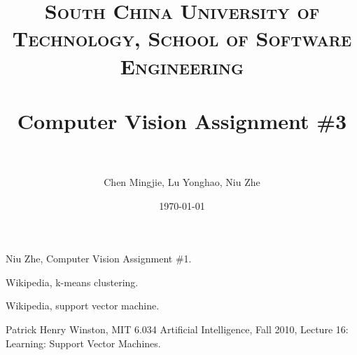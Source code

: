 \documentclass[paper=a4, fontsize=11pt]{scrartcl} %
\title{	
\normalfont \normalsize 
\textsc{South China University of Technology, School of Software Engineering} \\ [25pt] %
\horrule{0.5pt} \\[0.4cm] %
\huge Computer Vision Assignment \#3 \\ %
\horrule{2pt} \\[0.5cm] %
}
\author{Chen Mingjie, Lu Yonghao, Niu Zhe} %
\date{\normalsize\today} %
\numberwithin{equation}{section} %
\numberwithin{figure}{section} %
\numberwithin{table}{section} %
\begin{document}
\maketitle %





















\renewcommand\refname{Reference}

\begin{thebibliography}{99}
Niu Zhe, Computer Vision Assignment \#1.

Wikipedia, k-means clustering.

Wikipedia, support vector machine.

Patrick Henry Winston, MIT 6.034 Artificial Intelligence, Fall 2010, Lecture 16: Learning: Support Vector Machines.

\end{thebibliography}
\end{document}

